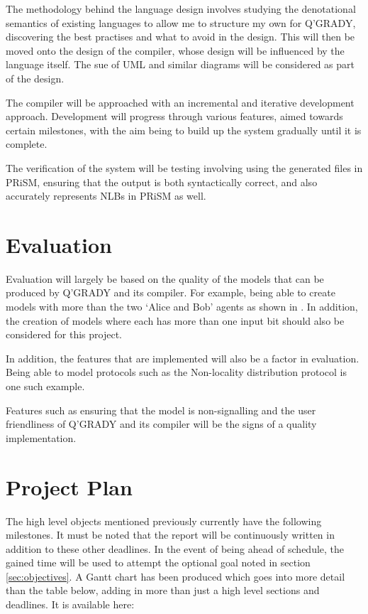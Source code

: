 \documentclass[11pt, a4paper]{article}
\begin{document}
The methodology behind the language design involves studying the denotational
semantics of existing languages to allow me to structure my own for Q'GRADY,
discovering the best practises and what to avoid in the design. This will then
be moved onto the design of the compiler, whose design will be influenced by the
language itself. The sue of UML and similar diagrams will be considered as part
of the design.

The compiler will be approached with an incremental and iterative development
approach. Development will progress through various features, aimed towards
certain milestones, with the aim being to build up the system gradually until it
is complete.

The verification of the system will be testing involving using the generated
files in PRiSM, ensuring that the output is both syntactically correct, and also
accurately represents NLBs in PRiSM as well.


\section{Evaluation} %
\label{sec:evaluation}
Evaluation will largely be based on the quality of the models that can be
produced by Q'GRADY and its compiler. For example, being able to create models
with more than the two `Alice and Bob' agents as shown in 
\cite[Definition~1]{nlb_lamontague}. In addition, the creation of models where
each has more than one input bit should also be considered for this project.

In addition, the features that are implemented will also be a factor in
evaluation. Being able to model protocols such as the Non-locality distribution
protocol \cite[Definition~16]{nlb_lamontague} is one such example.

Features such as ensuring that the model is non-signalling and the user
friendliness of Q'GRADY and its compiler will be the signs of a quality
implementation.


\section{Project Plan} %
\label{sec:project_plan}
The high level objects mentioned previously currently have the following
milestones. It must be noted that the report will be continuously written in
addition to these other deadlines. In the event of being ahead of schedule, the
gained time will be used to attempt the optional goal noted in section
\ref{sec:objectives}. A Gantt chart has been produced which goes into more
detail than the table below, adding in more than just a high level sections and
deadlines. It is available here:
\end{document}
